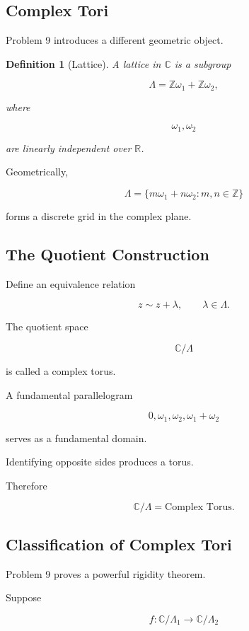 \documentclass[12pt,a4paper]{article}
\theoremstyle{notespace}
\newtheorem{definition}{Definition}[subsection]
\begin{document}
\subsection{Complex Tori}

Problem 9 introduces a different geometric object.

\begin{definition}[Lattice]
	A lattice in \(\mathbb C\) is a subgroup
	
	\[
	\Lambda
	=
	\mathbb Z\omega_1
	+
	\mathbb Z\omega_2,
	\]
	
	where
	
	\[
	\omega_1,\omega_2
	\]
	
	are linearly independent over \(\mathbb R\).
\end{definition}

Geometrically,

\[
\Lambda
=
\{
m\omega_1+n\omega_2
:
m,n\in\mathbb Z
\}
\]

forms a discrete grid in the complex plane.

\subsection{The Quotient Construction}

Define an equivalence relation

\[
z\sim z+\lambda,
\qquad
\lambda\in\Lambda.
\]

The quotient space

\[
\mathbb C/\Lambda
\]

is called a complex torus.

A fundamental parallelogram

\[
0,\omega_1,\omega_2,\omega_1+\omega_2
\]

serves as a fundamental domain.

Identifying opposite sides produces a torus.

Therefore

\[
\boxed{
	\mathbb C/\Lambda
	=
	\text{Complex Torus}.
}
\]

\subsection{Classification of Complex Tori}

Problem 9 proves a powerful rigidity theorem.

Suppose

\[
f:
\mathbb C/\Lambda_1
\longrightarrow
\mathbb C/\Lambda_2
\]
\end{document}
